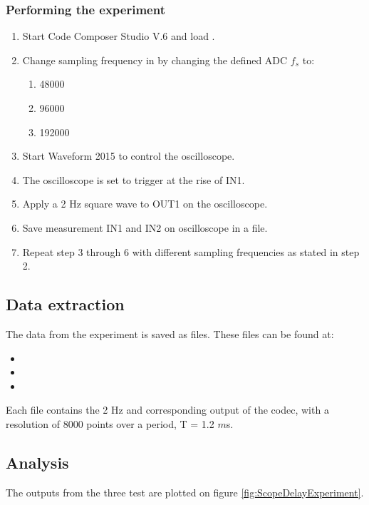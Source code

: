 \subsubsection{Performing the experiment}
\begin{enumerate}
	\item Start Code Composer Studio V.6 and load .
	\item Change sampling frequency in  by changing the defined ADC $f_s$ to:
	\begin{enumerate}
		\item 48000
		\item 96000
		\item 192000
	\end{enumerate}
	\item Start Waveform 2015 to control the oscilloscope.
	\item The oscilloscope is set to trigger at the rise of IN1.
	\item Apply a 2 Hz square wave to OUT1 on the oscilloscope.
	\item Save measurement IN1 and IN2 on oscilloscope in a  file.
	\item Repeat step 3 through 6 with different sampling frequencies as stated in step 2.
\end{enumerate}

\subsection{Data extraction}

The data from the experiment is saved as  files. These files can be found at:
\begin{itemize}
	\item {}
	\item {}
	\item {}
\end{itemize}

Each file contains the 2 Hz and corresponding output of the codec, with a resolution of 8000 points over a period, T = 1.2 $m$s.


\subsection{Analysis}\label{sec:AnalysisFsDelay}
The outputs from the three test are plotted on figure \ref{fig:ScopeDelayExperiment}.

